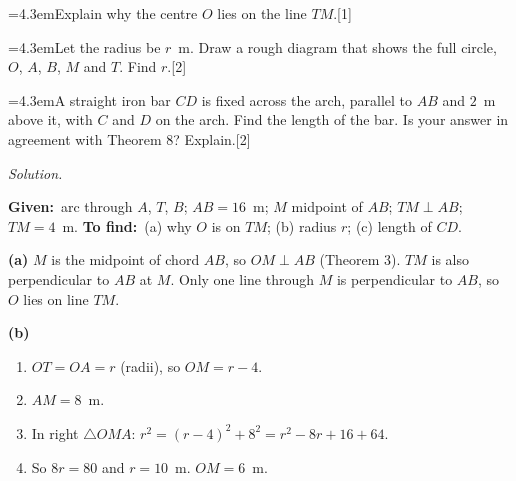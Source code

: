 \documentclass[11pt,a4paper]{article}
\newcommand{\pc}[2]{\par\smallskip\noindent\hspace*{2em}\hangindent=4.3em\hangafter=1\makebox[2em][l]{(#1)}\hspace{0.3em}#2\par}
\newenvironment{answerblock}
  {\par\needspace{6\baselineskip}\smallskip\begingroup\small\linespread{1.2}\selectfont\color{muted}\noindent\textit{Solution.}\par}
  {\par\endgroup\medskip}
\newcommand{\mks}[1]{\hfill\mbox{[#1]}}
\newcommand{\tr}{\triangle}
\newcommand{\Given}{\textbf{Given:}~}
\newcommand{\Tofind}{\textbf{To find:}~}
\begin{document}
\pc{a}{Explain why the centre $O$ lies on the line $TM$.\mks{1}}
\pc{b}{Let the radius be $r$~m. Draw a rough diagram that shows the full circle, $O$, $A$, $B$, $M$ and $T$. Find $r$.\mks{2}}
\pc{c}{A straight iron bar $CD$ is fixed across the arch, parallel to $AB$ and $2$~m above it, with $C$ and $D$ on the arch. Find the length of the bar. Is your answer in agreement with Theorem 8? Explain.\mks{2}}

\begin{answerblock}
\begin{minipage}[t]{0.66\linewidth}\vspace{0pt}
\Given arc through $A$, $T$, $B$; $AB=16$~m; $M$ midpoint of $AB$; $TM\perp AB$; $TM=4$~m. \Tofind (a) why $O$ is on $TM$; (b) radius $r$; (c) length of $CD$.

\textbf{(a)} $M$ is the midpoint of chord $AB$, so $OM\perp AB$ (Theorem 3). $TM$ is also perpendicular to $AB$ at $M$. Only one line through $M$ is perpendicular to $AB$, so $O$ lies on line $TM$.

\textbf{(b)}
\begin{enumerate}[label=\arabic*.,leftmargin=1.6em,itemsep=0pt,topsep=2pt]
\item $OT=OA=r$ (radii), so $OM=r-4$.
\item $AM=8$~m.
\item In right $\tr OMA$: $r^2=(r-4)^2+8^2=r^2-8r+16+64$.
\item So $8r=80$ and $r=10$~m. $OM=6$~m.
\end{enumerate}


\end{minipage}
\end{answerblock}
\end{document}
